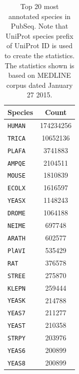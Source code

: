 \begin{table}[htbp]
\caption{Top 20 most annotated species in PubSeq. Note that UniProt species prefix of UniProt ID is used to create the statistics. The statistics shown is based on MEDLINE corpus dated January 27 2015.}
\centering
\begin{tabular}{ l c }
  \hline
  Species & Count \\
  \hline
  \hline
  \texttt{HUMAN} & 174234256 \\
  \hline
  \texttt{TRICA} & 10652136 \\
  \hline
  \texttt{PLAFA} & 3741883 \\
  \hline
  \texttt{AMPQE} & 2104511 \\
  \hline
  \texttt{MOUSE} & 1810839 \\
  \hline
  \texttt{ECOLX} & 1616597 \\
  \hline
  \texttt{YEASX} & 1148243 \\
  \hline
  \texttt{DROME} & 1064188 \\
  \hline
  \texttt{NEIME} & 697748 \\
  \hline
  \texttt{ARATH} & 602577 \\
  \hline
  \texttt{PlAVI} & 535429 \\
  \hline
  \texttt{RAT} & 376578 \\
  \hline
  \texttt{STREE} & 275870 \\
  \hline
  \texttt{KLEPN} & 259444 \\
  \hline
  \texttt{YEASK} & 214788 \\
  \hline
  \texttt{YEAS7} & 211277 \\
  \hline
  \texttt{YEAST} & 210358 \\
  \hline
  \texttt{STRPY} & 203976 \\
  \hline
  \texttt{YEAS6} & 200899 \\
  \hline
  \texttt{YEAS8} & 200899 \\
  \hline
\end{tabular}
  \label{tab:NERRanking}
\end{table}